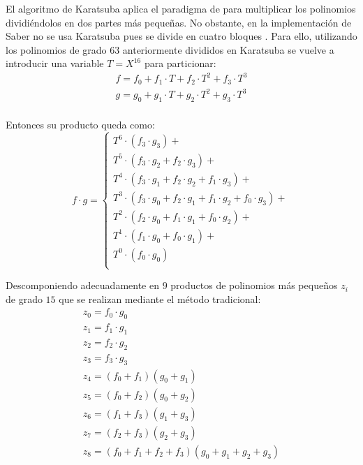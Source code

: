 El algoritmo de Karatsuba aplica el paradigma de  para multiplicar los polinomios dividiéndolos en dos partes más pequeñas. No obstante, en la implementación de Saber no se usa Karatsuba  pues se divide en cuatro bloques \cite{saber-spec-2020}. Para ello, utilizando los polinomios de grado \(63\) anteriormente divididos en Karatsuba se vuelve a introducir una variable \(T=X^{16}\) para particionar:
\begin{equation}
	\begin{array}{l}
		f=f_0+f_1\cdot T+f_2\cdot T^2+f_3\cdot T^3\\
		g=g_0+g_1\cdot T+g_2\cdot T^2+g_3\cdot T^3\\
	\end{array}
\end{equation}

Entonces su producto queda como:
\begin{equation}
	f\cdot g =\left\{ \begin{array}{l}
		T^{6}\cdot \left(f_3\cdot g_3\right)+\\
		T^{5}\cdot \left(f_3\cdot g_2+f_2\cdot g_3\right)+\\
		T^{4}\cdot \left(f_3\cdot g_1+f_2\cdot g_2+f_1\cdot g_3\right)+\\
		T^{3}\cdot \left(f_3\cdot g_0+f_2\cdot g_1+f_1\cdot g_2+f_0\cdot g_3\right)+\\
		T^{2}\cdot \left(f_2\cdot g_0+f_1\cdot g_1+f_0\cdot g_2\right)+\\
		T^{1}\cdot \left(f_1\cdot g_0+f_0\cdot g_1\right)+\\
		T^{0}\cdot\left(f_0\cdot g_0\right)\\
	\end{array}\right.
\end{equation}
\newpage

Descomponiendo adecuadamente en \(9\) productos de polinomios más pequeños \(z_i\) de grado \(15\) que se realizan mediante el método tradicional:
\begin{equation}
	\begin{array}{l}
		z_0=f_0\cdot g_0\\
		z_1=f_1\cdot g_1\\
		z_2=f_2\cdot g_2\\
		z_3=f_3\cdot g_3\\
		z_4=\left(f_0+f_1\right)\left(g_0+g_1\right)\\
		z_5=\left(f_0+f_2\right)\left(g_0+g_2\right)\\
		z_6=\left(f_1+f_3\right)\left(g_1+g_3\right)\\
		z_7=\left(f_2+f_3\right)\left(g_2+g_3\right)\\
		z_8=\left(f_0+f_1+f_2+f_3\right)\left(g_0+g_1+g_2+g_3\right)\\
	\end{array}
	\label{eq:kar_decom}
\end{equation}

